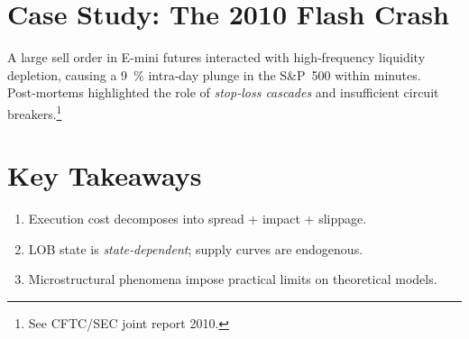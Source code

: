\section{Case Study: The 2010 Flash Crash}

A large sell order in E‑mini futures interacted with
high‑frequency liquidity depletion, causing a
\SI{9}{\percent} intra‑day plunge in the S\&P 500 within minutes.
Post‑mortems highlighted the role of \emph{stop‑loss cascades}
and insufficient circuit breakers.\footnote{See CFTC/SEC joint report 2010.}

\section*{Key Takeaways}
\begin{enumerate}
  \item Execution cost decomposes into spread + impact + slippage.
  \item LOB state is \emph{state‑dependent}; supply curves are endogenous.
  \item Microstructural phenomena impose practical limits on theoretical models.
\end{enumerate}
